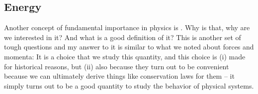 \documentclass[../class_mech_main.tex]{subfiles}
\begin{document}



		\subsection{Energy}
Another concept of fundamental importance in physics is . Why is that, why are we interested in it? And what is a good definition of it? This is another set of tough questions and my answer to it is similar to what we noted about forces and momenta: It is a choice that we study this quantity, and this choice is (i) made for historical reasons, but (ii) also because they turn out to be convenient because we can ultimately derive things like conservation laws for them -- it simply turns out to be a good quantity to study the behavior of physical systems.
\end{document}
